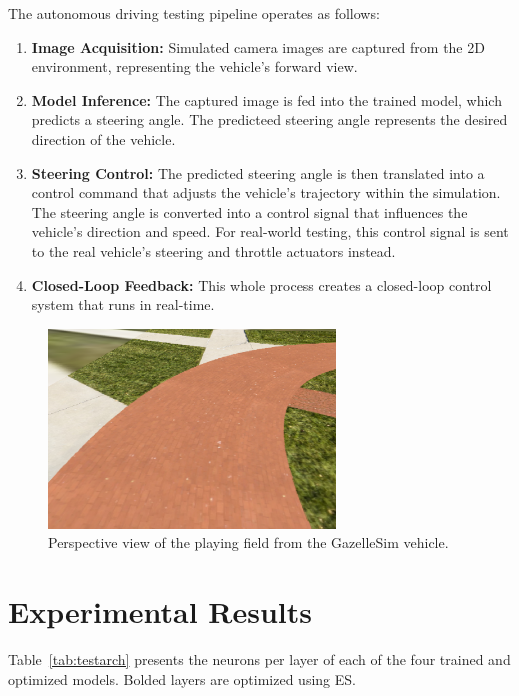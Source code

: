 \documentclass[conference]{IEEEtran}
\begin{document}
The autonomous driving testing pipeline operates as follows:

\begin{enumerate}
    \item \textbf{Image Acquisition:} Simulated camera images are captured from the 2D environment, representing the vehicle's forward view.
    \item \textbf{Model Inference:} The captured image is fed into the trained model, which predicts a steering angle. The predicteed steering angle represents the desired direction of the vehicle.
    \item \textbf{Steering Control:} The predicted steering angle is then translated into a control command that adjusts the vehicle's trajectory within the simulation. The steering angle is converted into a control signal that influences the vehicle's direction and speed. For real-world testing, this control signal is sent to the real vehicle's steering and throttle actuators instead.
    \item \textbf{Closed-Loop Feedback:} This whole process creates a closed-loop control system that runs in real-time.
\end{enumerate}

\begin{figure}[ht]
    \centering
    \includegraphics[width=3in]{assets/Gazelle-Camera-View.png}
    \caption{ Perspective view of the playing field from the GazelleSim vehicle. }
    \label{fig:camview}
\end{figure}

\section{Experimental Results}

Table~\ref{tab:testarch} presents the neurons per layer of each of the four trained and optimized models. Bolded layers are optimized using ES.

\newcommand{\gr}{\textgreater}
\end{document}
